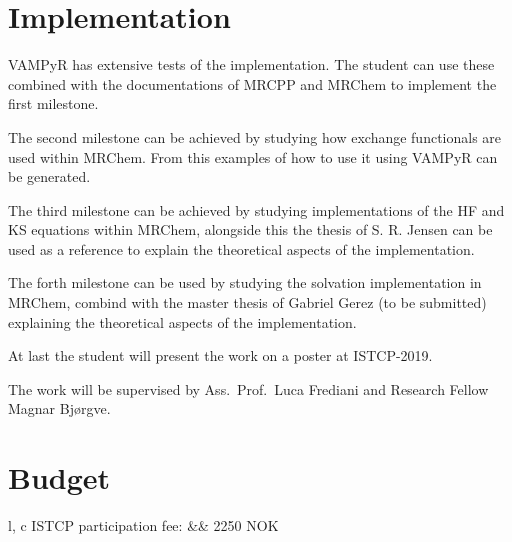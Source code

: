 \documentclass[12pt]{article}
\begin{document}
\section{Implementation}

VAMPyR has extensive tests of the implementation. The student can use these
combined with the documentations of \ac{MRCPP} and \ac{MRChem} to implement
the first milestone.

The second milestone can be achieved by studying how exchange functionals
are used within \ac{MRChem}. From this examples of how to use it using VAMPyR
can be generated.

The third milestone can be achieved by studying implementations of the
\ac{HF} and \ac{KS} equations within \ac{MRChem}, alongside this the
thesis of S. R. Jensen can be used as a reference to explain the
theoretical aspects of the implementation.

The forth milestone can be used by studying the solvation implementation
in \ac{MRChem}, combind with the master thesis of Gabriel Gerez (to be submitted) explaining
the theoretical aspects of the implementation.

At last the student will present the work on a poster at ISTCP-2019.


The work will be supervised by Ass.~Prof.~Luca Frediani and Research Fellow
Magnar Bj\o rgve.

\section{Budget}

\begin{tabular}{l, c}
    ISTCP participation fee: && 2250 NOK
\end{tabular}





\end{document}

